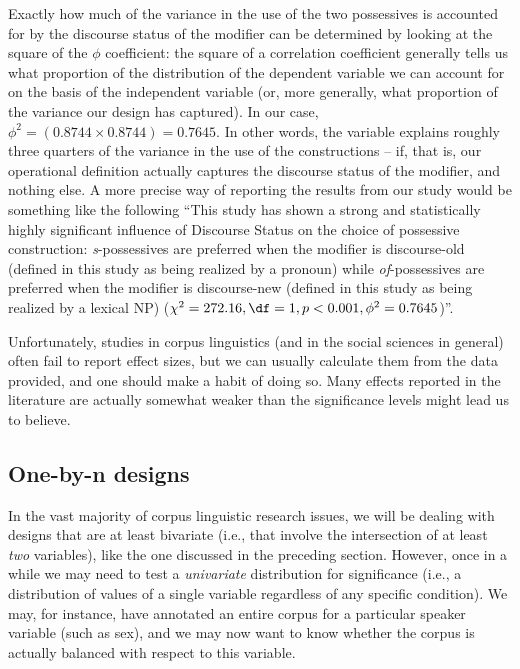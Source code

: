 Exactly how much of the variance  in the use of the two possessives  is accounted for by the discourse status of the modifier can be determined by looking at the square of the $\phi$ coefficient:  the square of a correlation coefficient generally tells us what proportion of the distribution  of the dependent variable we can account for on the basis of the independent variable (or, more generally, what proportion of the variance  our design  has captured). In our case, $\phi^2 = (0.8744 \times 0.8744 ) = 0.7645$. In other words, the variable  explains roughly three quarters of the variance  in the use of the  constructions -- if, that is, our operational  definition actually captures the discourse status of the modifier, and nothing else. A more precise way of reporting the results from our study would be something like the following ``This study has shown a strong and statistically highly significant  influence of Discourse Status on the choice of possessive  construction: \textit{s}-possessives are preferred when the modifier is discourse\hyp{}old (defined in this study as being realized by a pronoun)  while \textit{of}-possessives are preferred when the modifier is discourse\hyp{}new (defined in this study as being realized by a lexical NP)  ($\chi^2 = 272.16, \df = 1, p < 0.001, \phi^2 = 0.7645$)''.

Unfortunately, studies in corpus linguistics (and in the social sciences in general) often fail to report effect sizes,  but we can usually calculate them from the data provided, and one should make a habit of doing so. Many effects reported in the literature are actually somewhat weaker than the significance  levels might lead us to believe.

\subsection{One\hyp{}by\hyp{}n designs}
\label{sec:chisquareonebyn}

In the vast majority of corpus linguistic research issues, we will be dealing with designs  that are at least bivariate  (i.e., that involve the intersection of at least \textit{two} variables), like the one discussed in the preceding section. However, once in a while we may need to test a \textit{univariate} distribution  for significance  (i.e., a distribution of values of a single variable regardless of any specific condition). We may, for instance, have annotated  an entire corpus for a particular speaker variable (such as sex), and we may now want to know whether the corpus is actually balanced with respect to this variable.

